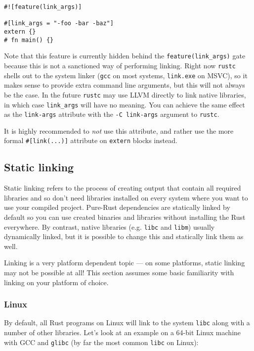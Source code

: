 \documentclass[a4paper,]{book}
\begin{document}
\begin{verbatim}
#![feature(link_args)]

#[link_args = "-foo -bar -baz"]
extern {}
# fn main() {}
\end{verbatim}

Note that this feature is currently hidden behind the
\texttt{feature(link\_args)} gate because this is not a sanctioned way
of performing linking. Right now \texttt{rustc} shells out to the system
linker (\texttt{gcc} on most systems, \texttt{link.exe} on MSVC), so it
makes sense to provide extra command line arguments, but this will not
always be the case. In the future \texttt{rustc} may use LLVM directly
to link native libraries, in which case \texttt{link\_args} will have no
meaning. You can achieve the same effect as the \texttt{link-args}
attribute with the \texttt{-C\ link-args} argument to \texttt{rustc}.

It is highly recommended to \emph{not} use this attribute, and rather
use the more formal \texttt{\#{[}link(...){]}} attribute on
\texttt{extern} blocks instead.

\subsection{Static linking}\label{static-linking}

Static linking refers to the process of creating output that contain all
required libraries and so don't need libraries installed on every system
where you want to use your compiled project. Pure-Rust dependencies are
statically linked by default so you can use created binaries and
libraries without installing the Rust everywhere. By contrast, native
libraries (e.g. \texttt{libc} and \texttt{libm}) usually dynamically
linked, but it is possible to change this and statically link them as
well.

Linking is a very platform dependent topic --- on some platforms, static
linking may not be possible at all! This section assumes some basic
familiarity with linking on your platform of choice.

\subsubsection{Linux}\label{linux}

By default, all Rust programs on Linux will link to the system
\texttt{libc} along with a number of other libraries. Let's look at an
example on a 64-bit Linux machine with GCC and \texttt{glibc} (by far
the most common \texttt{libc} on Linux):
\end{document}
